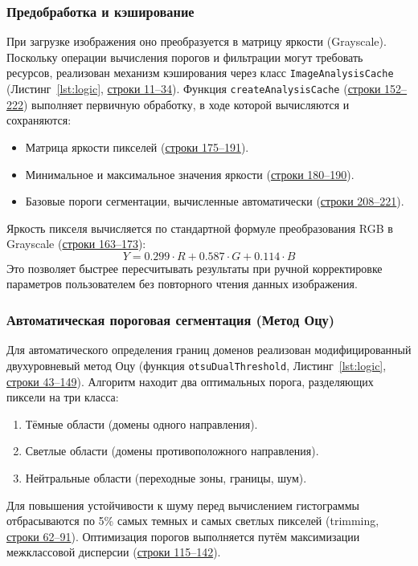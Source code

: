 \documentclass[12pt,a4paper]{article}
\numberwithin{equation}{section}
\begin{document}
\subsubsection{Предобработка и кэширование}
При загрузке изображения оно преобразуется в матрицу яркости (Grayscale). Поскольку операции вычисления порогов и фильтрации могут требовать ресурсов, реализован механизм кэширования через класс \texttt{ImageAnalysisCache} (Листинг~\ref{lst:logic}, \hyperref[logic:cache]{строки 11--34}). Функция \texttt{createAnalysisCache} (\hyperref[logic:createcache]{строки 152--222}) выполняет первичную обработку, в ходе которой вычисляются и сохраняются:
\begin{itemize}
    \item Матрица яркости пикселей (\hyperref[logic:matrix]{строки 175--191}).
    \item Минимальное и максимальное значения яркости (\hyperref[logic:minmax]{строки 180--190}).
    \item Базовые пороги сегментации, вычисленные автоматически (\hyperref[logic:basethresh]{строки 208--221}).
\end{itemize}
Яркость пикселя вычисляется по стандартной формуле преобразования RGB в Grayscale (\hyperref[logic:brightness]{строки 163--173}):
\[
Y = 0.299 \cdot R + 0.587 \cdot G + 0.114 \cdot B
\]
Это позволяет быстрее пересчитывать результаты при ручной корректировке параметров пользователем без повторного чтения данных изображения.

\subsubsection{Автоматическая пороговая сегментация (Метод Оцу)}
Для автоматического определения границ доменов реализован модифицированный двухуровневый метод Оцу (функция \texttt{otsuDualThreshold}, Листинг~\ref{lst:logic}, \hyperref[logic:otsu]{строки 43--149}). Алгоритм находит два оптимальных порога, разделяющих пиксели на три класса:
\begin{enumerate}
    \item Тёмные области (домены одного направления).
    \item Светлые области (домены противоположного направления).
    \item Нейтральные области (переходные зоны, границы, шум).
\end{enumerate}
Для повышения устойчивости к шуму перед вычислением гистограммы отбрасываются по 5\% самых темных и самых светлых пикселей (trimming, \hyperref[logic:trim]{строки 62--91}). Оптимизация порогов выполняется путём максимизации межклассовой дисперсии (\hyperref[logic:variance]{строки 115--142}).
\end{document}
